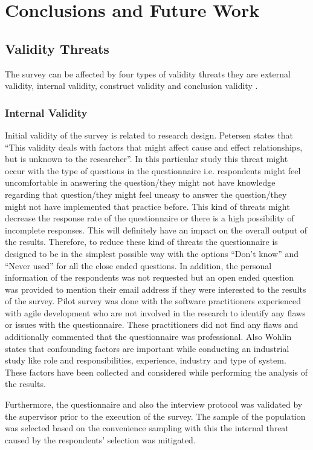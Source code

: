 \documentclass[a4paper,oneside]{bth}
\begin{document}
\chapter{Conclusions and Future Work}
\section{Validity Threats}
The survey can be affected by four types of validity threats they are external validity, internal validity, construct validity and conclusion validity \cite{wohlin_experimentation_2012}.
\subsection{Internal Validity}
Initial validity of the survey is related to research design. Petersen \cite{petersen_worldviews_2013}  states that “This validity deals with factors that might affect cause and effect relationships, but is unknown to the researcher”. In this particular study this threat might occur with the type of questions in the questionnaire i.e. respondents might feel uncomfortable in answering the question/they might not have knowledge regarding that question/they might feel uneasy to answer the question/they might not have implemented that practice before. This kind of threats might decrease the response rate of the questionnaire or there is a high possibility of incomplete responses. This will definitely have an impact on the overall output of the results. Therefore, to reduce these kind of threats the questionnaire is designed to be in the simplest possible way with the options “Don’t know” and “Never used” for all the close ended questions. In addition, the personal information of the respondents was not requested but an open ended question was provided to mention their email address if they were interested to the results of the survey. Pilot survey was done with the software practitioners experienced with agile development who are not involved in the research to identify any flaws or issues with the questionnaire. These practitioners did not find any flaws and additionally commented that the questionnaire was professional. Also Wohlin states that confounding factors are important while conducting an industrial study like role and responsibilities, experience, industry and type of system. These factors have been collected and considered while performing the analysis of the results.

Furthermore, the questionnaire and also the interview protocol was validated by the supervisor prior to the execution of the survey. The sample of the population was selected based on the convenience sampling with this the internal threat caused by the respondents’ selection was mitigated.
\end{document}
